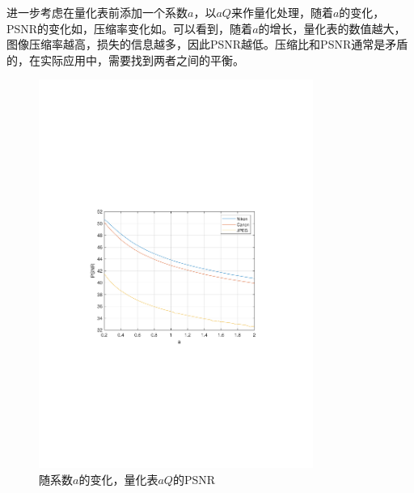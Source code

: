 \documentclass[12pt,a4paper]{article}
\begin{document}
进一步考虑在量化表前添加一个系数$a$，以$aQ$来作量化处理，随着$a$的变化，PSNR的变化如，压缩率变化如。可以看到，随着$a$的增长，量化表的数值越大，图像压缩率越高，损失的信息越多，因此PSNR越低。压缩比和PSNR通常是矛盾的，在实际应用中，需要找到两者之间的平衡。

\begin{figure}[H]
    \centering
    \includegraphics[width=0.8\textwidth,trim={3.09cm 9.295cm 3.09cm 9.295cm},clip]{../output/quant_factor_psnr.pdf}
    \caption{随系数$a$的变化，量化表$aQ$的PSNR}
    \label{fig:quant_factor_psnr}
\end{figure}
\end{document}
